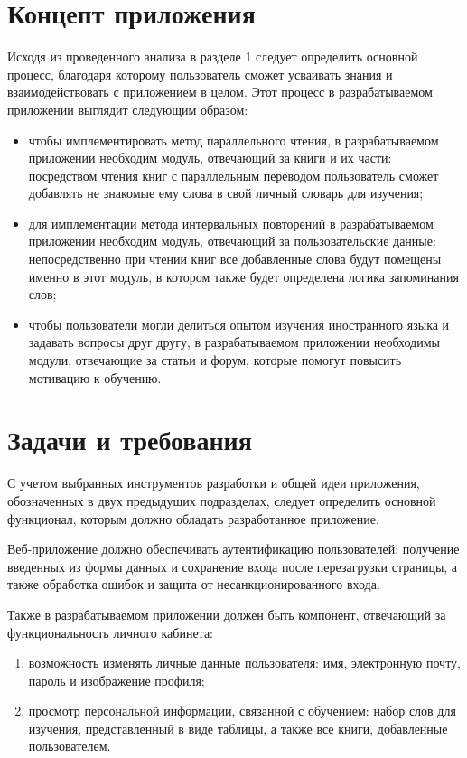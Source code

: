 \section{Концепт приложения}

Исходя из проведенного анализа в разделе 1 следует определить основной процесс, благодаря которому пользователь сможет усваивать знания и взаимодействовать с приложением в целом. Этот процесс в разрабатываемом приложении выглядит следующим образом:

\begin{itemize}
	\item чтобы имплементировать метод параллельного чтения, в разрабатываемом приложении необходим модуль, отвечающий за книги и их части: посредством чтения книг с параллельным переводом пользователь сможет добавлять не знакомые ему слова в свой личный словарь для изучения;
	\item для имплементации метода интервальных повторений в разрабатываемом приложении необходим модуль, отвечающий за пользовательские данные: непосредственно при чтении книг все добавленные слова будут помещены именно в этот модуль, в котором также будет определена логика запоминания слов;
	\item чтобы пользователи могли делиться опытом изучения иностранного языка и задавать вопросы друг другу, в разрабатываемом приложении необходимы модули, отвечающие за статьи и форум, которые помогут повысить мотивацию к обучению.
\end{itemize}

\section{Задачи и требования}

С учетом выбранных инструментов разработки и общей идеи приложения, обозначенных в двух предыдущих подразделах, следует определить основной функционал, которым должно обладать разработанное приложение.

Веб-приложение должно обеспечивать аутентификацию пользователей: получение введенных из формы данных и сохранение входа после перезагрузки страницы, а также обработка ошибок и защита от несанкционированного входа.

Также в разрабатываемом приложении должен быть компонент, отвечающий за функциональность личного кабинета:

\begin{enumerate}
	\item возможность изменять личные данные пользователя: имя, электронную почту, пароль и изображение профиля;
	\item просмотр персональной информации, связанной с обучением: набор слов для изучения, представленный в виде таблицы, а также все книги, добавленные пользователем.
\end{enumerate}

